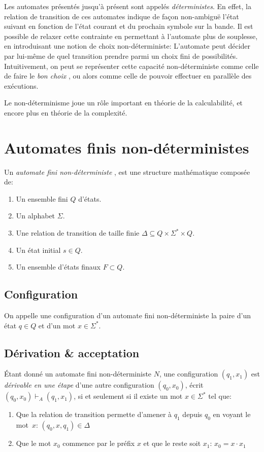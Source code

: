 Les automates présentés jusqu'à présent sont appelés \textit{déterministes}. En effet, la relation de transition de ces automates indique de façon non-ambiguë l'état suivant en fonction de l'état courant et du prochain symbole sur la bande.
Il est possible de relaxer cette contrainte en permettant à l'automate plus de souplesse, en introduisant une notion de choix non-déterministe: L'automate peut décider par lui-même de quel transition prendre parmi un choix fini de possibilités.
Intuitivement, on peut se représenter cette capacité non-déterministe comme celle de faire le \og \textit{bon choix} \fg, ou alors comme celle de pouvoir effectuer en parallèle des exécutions.

Le non-déterminisme joue un rôle important en théorie de la calculabilité, et encore plus en théorie de la complexité.

\section{Automates finis non-déterministes}

Un \og \textit{automate fini non-déterministe} \fg{}, est une structure mathématique composée de:
\begin{enumerate}
\item Un ensemble fini $Q$ d'états.
\item Un alphabet $\Sigma$.
\item Une relation de transition de taille finie $\Delta \subseteq Q \times \Sigma^* \times Q$.
\item Un état initial $s \in Q$.
\item Un ensemble d'états finaux $F \subset Q$.
\end{enumerate}

\subsection{Configuration}

On appelle une \og configuration \fg{} d'un automate fini non-déterministe la paire d'un état $q \in Q$ et d'un mot $x \in \Sigma^*$.

\subsection{Dérivation \& acceptation}

Étant donné un automate fini non-déterministe $N$, une configuration $(q_1, x_1)$ est \og \textit{dérivable en une étape} \fg{} d'une autre configuration $(q_0, x_0)$, écrit $(q_0, x_0) \vdash_A (q_1, x_1)$, si et seulement si il existe un mot $x \in \Sigma^*$ tel que:
\begin{enumerate}
\item Que la relation de transition permette d'amener à $q_1$ depuis $q_0$ en voyant le mot~$x$: $(q_0, x, q_1) \in \Delta$
\item Que le mot $x_0$ commence par le préfix $x$ et que le reste soit $x_1$: $x_0 = x \cdot x_1$
\end{enumerate}

